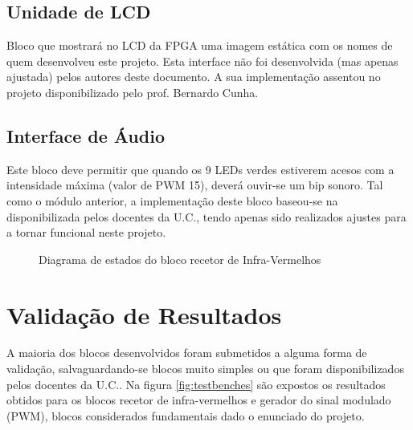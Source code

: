 \documentclass[a4paper,11pt,openright,oneside]{report}
\begin{document}
\subsection*{Unidade de LCD}

Bloco que mostrará no LCD da FPGA uma imagem estática com os nomes de quem desenvolveu este projeto. Esta interface não foi desenvolvida (mas apenas ajustada) pelos autores deste documento. A sua implementação assentou no projeto disponibilizado pelo prof. Bernardo Cunha.

\subsection*{Interface de Áudio}

Este bloco deve permitir que quando os 9 LEDs verdes estiverem acesos com a intensidade máxima (valor de PWM 15), deverá ouvir-se um bip sonoro. Tal como o módulo anterior, a implementação deste bloco baseou-se na disponibilizada pelos docentes da U.C., tendo apenas sido realizados ajustes para a tornar funcional neste projeto.

\begin{figure}[ht]
\center
{}
\caption{Diagrama de estados do bloco recetor de Infra-Vermelhos}
\label{fig:ir_leds1}
\end{figure}

\section{Validação de Resultados}
\label{sec:validação}

A maioria dos blocos desenvolvidos foram submetidos a alguma forma de validação, salvaguardando-se blocos muito simples ou que foram disponibilizados pelos docentes da U.C.. Na figura \ref{fig:testbenches} são expostos os resultados obtidos para os blocos recetor de infra-vermelhos e gerador do sinal modulado (PWM), blocos considerados fundamentais dado o enunciado do projeto.
\end{document}
